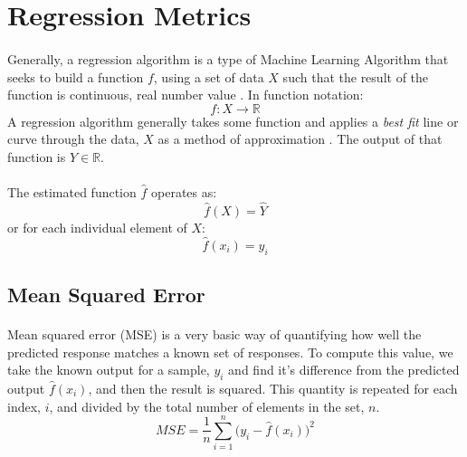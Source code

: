 \documentclass[12pt,letterpaper]{article}
\begin{document}

\section{Regression Metrics}
\paragraph*{}Generally, a regression algorithm is a type of Machine Learning Algorithm that seeks to build a function $f$, using a set of data $X$ such that the result of the function is continuous, real number value \cite{Petrik}. In function notation:
\begin{equation}
\label{regression function}
f: X \rightarrow \mathbb{R}
\end{equation}
A regression algorithm generally takes some function and applies a \textit{best fit} line or curve through the data, $X$ as a method of approximation \cite{James}. The output of that function is $Y \in \mathbb{R}$. 
\paragraph*{}The estimated function $\hat{f}$  operates as:
\begin{equation}
\hat{f}(X) = \hat{Y}
\end{equation}
or for each individual element of $X$:
\begin{equation}
\hat{f}(x_i) = \hat{y}_i
\end{equation}


\subsection{Mean Squared Error}
\paragraph*{}Mean squared error (MSE) is a very basic way of quantifying how well the predicted response matches a known set of responses. To compute this value, we take the known output for a sample, $y_i$ and find it's difference from the predicted output $\hat{f}(x_i)$, and then the result is squared. This quantity is repeated for each index, $i$, and divided by the total number of elements in the set, $n$.
\begin{equation}
\label{MSE}
MSE = \frac{1}{n}\sum_{i=1}^{n} \Big( y_i - \hat{f}(x_i) \Big)^2
\end{equation}
\end{document}
